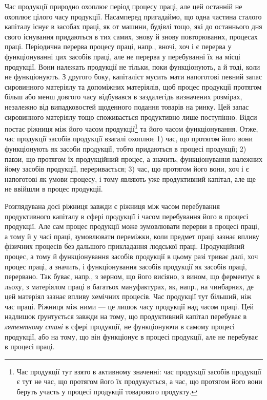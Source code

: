 Час продукції природно охоплює період процесу праці, але цей
останній не охоплює цілого часу продукції. Насамперед пригадаймо, що
одна частина сталого капіталу існує в засобах праці, як от машини,
будівлі тощо, які до останнього дня свого існування придаються в тих
самих, знову й знову повторюваних, процесах праці. Періодична перерва
процесу праці, напр., вночі, хоч і є перерва у функціонуванні цих засобів
праці, але не перерва у перебуванні їх на місці продукції. Вони
належать продукції не тільки, поки функціонують, а й тоді, коли не функціонують.
З другого боку, капіталіст мусить мати напоготові певний запас
сировинного матеріялу та допоміжних матеріялів, щоб процес продукції
протягом більш або менш довгого часу відбувався в заздалегідь визначених
розмірах, незалежно від випадковостей щоденного подання товарів
на ринку. Цей запас сировинного матеріялу тощо споживається продуктивно
лише поступінно. Відси постає ріжниця між його часом продукції\footnote{
Час продукції тут взято в активному значенні: час продукції засобів продукції
є тут не час, що протягом його їх продукується, а час, що протягом його
вони беруть участь у процесі продукції товарового продукту.
} та його часом функціонування. Отже, час продукції засобів
продукції взагалі охоплює 1) час, що протягом його вони функціонують
як засоби продукції, тобто придаються в процесі продукції;
2) павзи, що протягом їх продукційний процес, а значить, функціонування
належних йому засобів продукції, переривається; 3) час, що
протягом його вони, хоч і є напоготові як умови процесу, і тому являють
уже продуктивний капітал, але ще не ввійшли в процес продукції.

Розглядувана досі ріжниця завжди є ріжниця між часом перебування
продуктивного капіталу в сфері продукції і часом перебування його в
процесі продукції. Але сам процес продукції може зумовлювати перерви
в процесі праці, а тому й у часі праці, зумовлювати переміжки, коли
предмет праці зазнає впливу фізичних процесів без дальшого прикладання
людської праці. Продукційний процес, а тому й функціонування засобів
продукції в цьому разі триває далі, хоч процес праці, а значить, і функціонування
засобів продукції як засобів праці, перервано. Так буває, напр.,
з зерном, що його висіяно, з вином, що ферментує в льоху, з матеріялом
праці в багатьох мануфактурах, як, напр., на чинбарнях, де цей матеріял
зазнає впливу хемічних процесів. Час продукції тут більший, ніж час
праці. Ріжниця між ними — це лишок часу продукції над часом праці.
Цей надлишок ґрунтується завжди на тому, що продуктивний капітал
перебуває в \emph{лятентному стані} в сфері продукції, не функціонуючи в
самому процесі продукції, або на тому, що він функціонує в процесі
продукції, але не перебуває в процесі праці.

